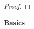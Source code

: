 \documentclass[a4paper,12pt]{article}
\theoremstyle{definition}
\newenvironment{problems}{\begin{list}{}{\renewcommand{\makelabel}[1]{\textbf{##1}\hfil}}}{\end{list}}
\begin{document}
\begin{problems}
\begin{proof}

    \end{proof}
\end{problems}

\noindent\textbf{Basics}
\end{document}
